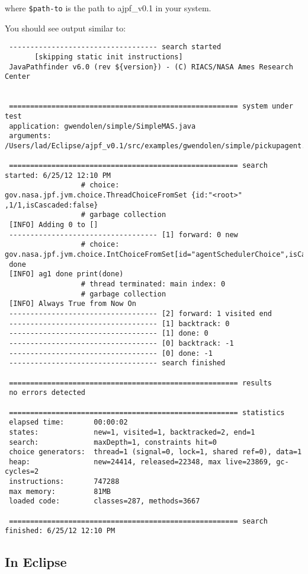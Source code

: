 \noindent where \texttt{\${path-to}} is the path to ajpf\_v0.1 in your system.

You should see output similar to: 

\noindent \begin{lstlisting}
 ----------------------------------- search started
       [skipping static init instructions]
 JavaPathfinder v6.0 (rev ${version}) - (C) RIACS/NASA Ames Research Center
 
 
 ====================================================== system under test
 application: gwendolen/simple/SimpleMAS.java
 arguments:   /Users/lad/Eclipse/ajpf_v0.1/src/examples/gwendolen/simple/pickupagent.gwen 
 
 ====================================================== search started: 6/25/12 12:10 PM
                  # choice: gov.nasa.jpf.jvm.choice.ThreadChoiceFromSet {id:"<root>" ,1/1,isCascaded:false}
                  # garbage collection
 [INFO] Adding 0 to []
 ----------------------------------- [1] forward: 0 new
                  # choice: gov.nasa.jpf.jvm.choice.IntChoiceFromSet[id="agentSchedulerChoice",isCascaded:false,>0]
 done
 [INFO] ag1 done print(done)
                  # thread terminated: main index: 0
                  # garbage collection
 [INFO] Always True from Now On
 ----------------------------------- [2] forward: 1 visited end
 ----------------------------------- [1] backtrack: 0
 ----------------------------------- [1] done: 0
 ----------------------------------- [0] backtrack: -1
 ----------------------------------- [0] done: -1
 ----------------------------------- search finished
 
 ====================================================== results
 no errors detected
 
 ====================================================== statistics
 elapsed time:       00:00:02
 states:             new=1, visited=1, backtracked=2, end=1
 search:             maxDepth=1, constraints hit=0
 choice generators:  thread=1 (signal=0, lock=1, shared ref=0), data=1
 heap:               new=24414, released=22348, max live=23869, gc-cycles=2
 instructions:       747288
 max memory:         81MB
 loaded code:        classes=287, methods=3667
 
 ====================================================== search finished: 6/25/12 12:10 PM
\end{lstlisting}

\subsection{In Eclipse}

